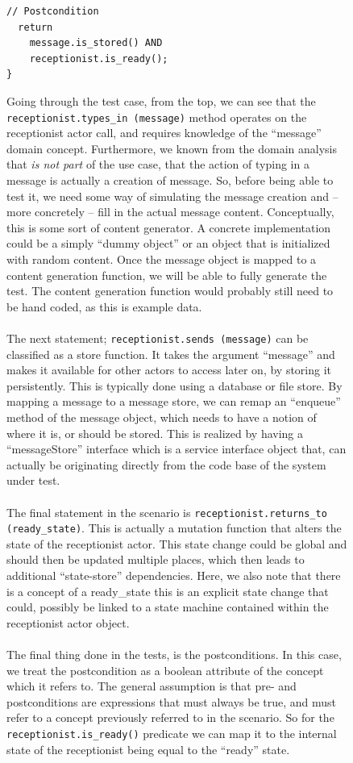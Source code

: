 \begin{figure}[!htbp]
\begin{lstlisting}[caption=Suggestion of generated test case,label={lst:uc2_example_test_code}]
  // Postcondition
  return
    message.is_stored() AND
    receptionist.is_ready();
}
\end{lstlisting}
Going through the test case, from the top, we can see that the \texttt{receptionist.types\_in~(message)} method operates on the receptionist actor call, and requires knowledge of the ``message'' domain concept. Furthermore, we known from the domain analysis that \emph{is not part} of the use case, that the action of typing in a message is actually a creation of message. So, before being able to test it, we need some way of simulating the message creation and -- more concretely -- fill in the actual message content. Conceptually, this is some sort of content generator. A concrete implementation could be a simply ``dummy object'' or an object that is initialized with random content. Once the message object is mapped to a content generation function, we will be able to fully generate the test. The content generation function would probably still need to be hand coded, as this is example data.\\\\
The next statement; \texttt{receptionist.sends (message)} can be classified as a store function. It takes the argument ``message'' and makes it available for other actors to access later on, by storing it persistently. This is typically done using a database or file store. By mapping a message to a message store, we can remap an ``enqueue'' method of the message object, which needs to have a notion of where it is, or should be stored. This is realized by having a ``messageStore'' interface which is a service interface object that, can actually be originating directly from the code base of the system under test.\\\\
The final statement in the scenario is \texttt{receptionist.returns\_to (ready\_state)}. This is actually a mutation function that alters the state of the receptionist actor. This state change could be global and should then  be updated multiple places, which then leads to additional ``state-store'' dependencies. Here, we also note that there is a concept of a ready\_state this is an explicit state change that could, possibly be linked to a state machine contained within the receptionist actor object.\\\\
The final thing done in the tests, is the postconditions. In this case, we treat the postcondition as a boolean attribute of the concept which it refers to. The general assumption is that pre- and postconditions are expressions that must always be true, and must refer to a concept previously referred to in the scenario. So for the \texttt{receptionist.is\_ready()} predicate we can map it to the internal state of the receptionist being equal to the ``ready'' state.\\\\

\end{figure}
